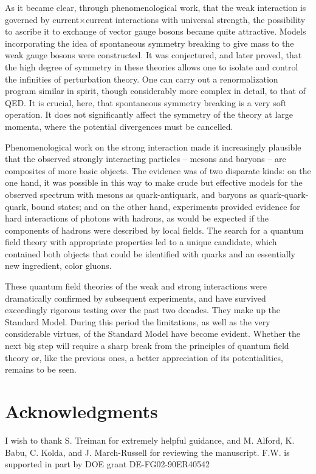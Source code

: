 \documentclass[aps,epsf]{revtex4}
\begin{document}
As it became clear, through phenomenological work, that the weak
interaction is governed by current$\times$current interactions with
universal strength, the possibility to ascribe it to exchange of
vector gauge bosons became quite attractive.  Models incorporating the
idea of spontaneous symmetry breaking to give mass to the weak gauge
bosons were constructed.  It was conjectured, and later proved, that
the high degree of symmetry in these theories allows one to isolate
and control the infinities of perturbation theory.  One can carry out
a renormalization program similar in spirit, though considerably more
complex in detail, to that of QED.  It is crucial, here, that
spontaneous symmetry breaking is a very soft operation.  It does not
significantly affect the symmetry of the theory at large momenta,
where the potential divergences must be cancelled.  

Phenomenological work on the strong interaction made it increasingly
plausible that the observed strongly interacting particles -- mesons
and baryons -- are composites of more basic objects.  The evidence was
of two disparate kinds: on the one hand, it was possible in this way
to make crude but effective models for the observed spectrum with
mesons as quark-antiquark, and baryons as quark-quark-quark, bound
states; and on the other hand, experiments provided evidence for hard
interactions of photons with hadrons, as would be expected if the
components of hadrons were described by local fields.  The search for
a quantum field theory with appropriate properties led to a unique
candidate, which contained both objects that could be identified with
quarks and an essentially new ingredient, color gluons.

These quantum field theories of the
weak and strong interactions were dramatically confirmed by subsequent
experiments, and have survived exceedingly rigorous testing over the
past two decades.  They make up the Standard Model.  During this
period the limitations, as well as the very considerable virtues, of
the Standard Model have become evident.  Whether the next big step
will require a sharp break from the principles of quantum field theory
or, like the previous ones, a better appreciation of its
potentialities, remains to be seen.


\section*{Acknowledgments}
I wish to thank S. Treiman for extremely helpful guidance, and
M. Alford, K. Babu, C. Kolda, and J. March-Russell for reviewing the
manuscript.  F.W. is supported in part by DOE grant DE-FG02-90ER40542
\end{document}
